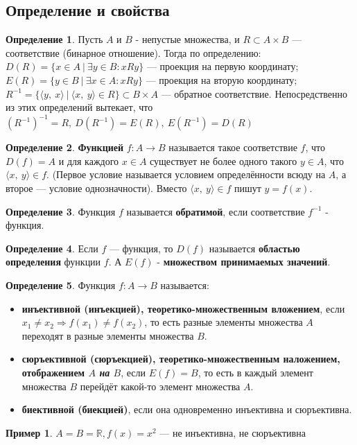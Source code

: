 \documentclass[12pt,oneside]{article}
\theoremstyle{definition}
\newtheorem{definition}{Определение}
\newtheorem{exmp}{Пример}[section]
\begin{document}
\subsection{Определение и свойства}
\begin{definition}
Пусть $A$ и $B$ - непустые множества, и $R\subset A\times B$ --- соответствие (бинарное отношение). Тогда по определению:
\newline
$D(R) = \{x\in A\ |\ \exists y\in B: xRy\}$ --- проекция на первую координату;
\newline
$E(R) = \{y\in B\ |\ \exists x\in A: xRy\}$ --- проекция на вторую координату;
\newline
$R^{-1} = \{\langle y,\ x\rangle\ |\ \langle x,\ y\rangle \in R\}\subset B\times A$ --- обратное соответствие.
\newline
Непосредственно из этих определений вытекает, что
\newline
$(R^{-1})^{-1} = R, \ D(R^{-1}) = E(R), \ E(R^{-1}) = D(R)$
\end{definition}
\begin{definition}
\textbf{Функцией} $f: A \longrightarrow B$ называется такое соответствие $f$, что $D(f)=A$ и для каждого $x\in A$ существует не более одного такого $y\in A$, что $\langle x,\ y\rangle \in f$. (Первое условие называется условием определённости всюду на $A$, а второе --- условие однозначности).
\newline
Вместо $\langle x,\ y \rangle \in f$ пишут $y=f(x)$.
\end{definition}
\begin{definition}
Функция $f$ называется \textbf{обратимой}, если соответствие $f^{-1}$ - функция.
\end{definition}
\begin{definition}
Если $f$ --- функция, то $D(f)$ называется \textbf{областью определения} функции $f$. А $E(f)$ - \textbf{множеством принимаемых значений}.
\end{definition}
\begin{definition}
Функция $f: A \longrightarrow B$ называется:
\begin{itemize}
    \item \textbf{инъективной (инъекцией), теоретико-множественным вложением}, если
    \newline
    $x_1 \neq x_2 \Longrightarrow f(x_1) \neq f(x_2)$, то есть разные элементы множества $A$ переходят в разные элементы множества $B$.
    \item \textbf{сюръективной (сюръекцией), теоретико-множественным наложением, отображением $A$ \textit{на} $B$}, если
    \newline
    $E(f)=B$, то есть в каждый элемент множества $B$ перейдёт какой-то элемент множества $A$.
    \item \textbf{биективной (биекцией)}, если она одновременно инъективна и сюръективна.
\end{itemize}
\end{definition}
\begin{exmp}
$A=B= \mathbb{R}, f(x)=x^2$ --- не инъективна, не сюръективна
\end{exmp}
\end{document}
